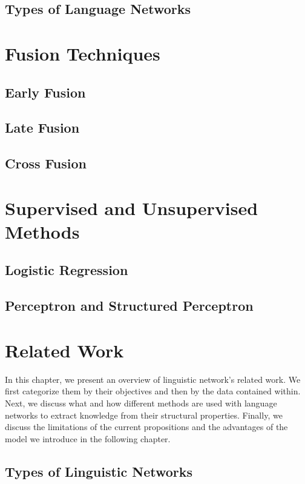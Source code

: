 \subsection{Types of Language Networks}
\section{Fusion Techniques}
\subsection{Early Fusion}
\subsection{Late Fusion}
\subsection{Cross Fusion}

\section{Supervised and Unsupervised Methods}
\subsection{Logistic Regression}
\subsection{Perceptron and Structured Perceptron}


\section{Related Work}
\label{chap:related_wk}


In this chapter, we present an overview of linguistic network's related work. We first categorize them by their objectives and then by the data contained within. Next, we discuss what and how different methods are used with language networks to extract knowledge from their structural properties. Finally, we discuss the limitations of the current propositions and the advantages of the model we introduce in the following chapter.
\subsection{Types of Linguistic Networks}

